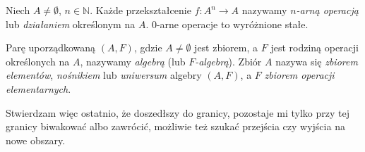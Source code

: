 \begin{definition}
Niech $A\neq \emptyset$, $n \in \mathbb{N}$. Każde przekształcenie $f:A^n \rightarrow A$ nazywamy \textit{$n$-arną operacją} lub \textit{działaniem} określonym na $A$.
0-arne operacje to wyróżnione stałe.
\end{definition}


\begin{definition}[Algebra]
Parę uporządkowaną $(A,F)$, gdzie $A\neq \emptyset$ jest zbiorem, a $F$ jest rodziną operacji określonych na $A$, nazywamy \textit{algebrą} (lub \textit{$F$-algebrą}). Zbiór $A$ nazywa się \textit{zbiorem elementów}, \textit{nośnikiem} lub \textit{uniwersum} algebry $(A,F)$, a $F$ \textit{zbiorem operacji elementarnych}.
\end{definition}

\begin{proposition}
Stwierdzam więc ostatnio, że doszedłszy do granicy, pozostaje mi tylko przy tej granicy biwakować albo zawrócić, możliwie też szukać przejścia czy wyjścia na nowe obszary.
\end{proposition}
